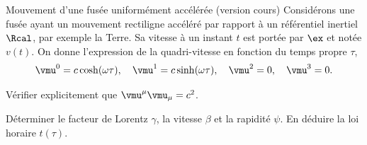 \begin{exo}[PC][2][TD]{Mouvement d’une fusée uniformément accélérée (version cours)}
  Considérons une fusée ayant un mouvement rectiligne accéléré par rapport à un référentiel inertiel $\Rcal$, par exemple la Terre. Sa vitesse à un instant $t$ est portée par $\ex$ et notée $v(t)$. On donne l'expression de la quadri-vitesse en fonction du temps propre $\tau$, 
  \begin{equation}
    \vmu^0=c \cosh (\omega \tau), \quad \vmu^1=c \sinh (\omega \tau), \quad \vmu^2=0, \quad \vmu^3=0.
  \end{equation}
% 
  \begin{quest}
    \item  Vérifier explicitement que $\vmu^\mu \vmu_\mu=c^2$. 
  
    \item Déterminer le facteur de Lorentz $\gamma$, la vitesse $\beta$ et la rapidité $\psi$. En déduire la loi horaire $t(\tau)$.
\end{quest}
\end{exo}
